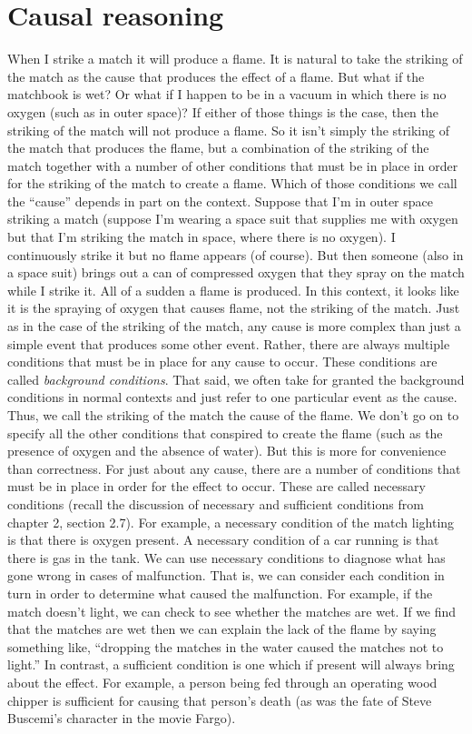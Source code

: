 \chapter{Causal reasoning}
When I strike a match it will produce a flame. It is natural to take the striking of
the match as the cause that produces the effect of a flame. But what if the
matchbook is wet? Or what if I happen to be in a vacuum in which there is no
oxygen (such as in outer space)? If either of those things is the case, then the
striking of the match will not produce a flame. So it isn't simply the striking of
the match that produces the flame, but a combination of the striking of the
match together with a number of other conditions that must be in place in order
for the striking of the match to create a flame. Which of those conditions we call
the ``cause'' depends in part on the context. Suppose that I'm in outer space
striking a match (suppose I'm wearing a space suit that supplies me with oxygen
but that I'm striking the match in space, where there is no oxygen). I
continuously strike it but no flame appears (of course). But then someone (also
in a space suit) brings out a can of compressed oxygen that they spray on the
match while I strike it. All of a sudden a flame is produced. In this context, it
looks like it is the spraying of oxygen that causes flame, not the striking of the
match. Just as in the case of the striking of the match, any cause is more
complex than just a simple event that produces some other event. Rather, there
are always multiple conditions that must be in place for any cause to occur.
These conditions are called \emph{background conditions}. That said, we often take
for granted the background conditions in normal contexts and just refer to one
particular event as the cause. Thus, we call the striking of the match the cause
of the flame. We don't go on to specify all the other conditions that conspired
to create the flame (such as the presence of oxygen and the absence of water).
But this is more for convenience than correctness. For just about any cause,
there are a number of conditions that must be in place in order for the effect to
occur. These are called necessary conditions (recall the discussion of necessary
and sufficient conditions from chapter 2, section 2.7). For example, a necessary
condition of the match lighting is that there is oxygen present. A necessary
condition of a car running is that there is gas in the tank. We can use necessary
conditions to diagnose what has gone wrong in cases of malfunction. That is,
we can consider each condition in turn in order to determine what caused the
malfunction. For example, if the match doesn't light, we can check to see
whether the matches are wet. If we find that the matches are wet then we can
explain the lack of the flame by saying something like, ``dropping the matches in
the water caused the matches not to light.'' In contrast, a sufficient condition is
one which if present will always bring about the effect. For example, a person
being fed through an operating wood chipper is sufficient for causing that
person's death (as was the fate of Steve Buscemi's character in the movie Fargo).

